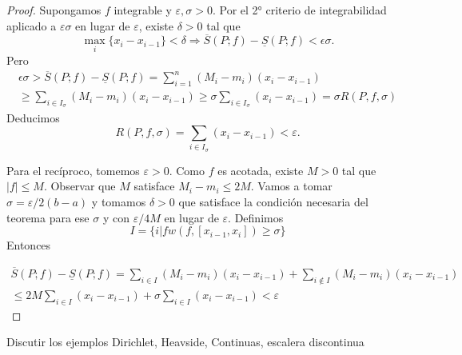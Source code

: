\begin{proof} Supongamos $f$ integrable y $\varepsilon,\sigma>0$. Por el 2° criterio de integrabilidad aplicado a $ \varepsilon\sigma$ en lugar de $\varepsilon$, existe $\delta>0$ tal que 
\[\max_i\{x_i-x_{i-1}\}<\delta\Rightarrow 
 \overline{S}(P;f)-\underline{S}(P;f)<\epsilon\sigma.
\]
Pero 
\begin{multline*}\label{eq:3crite}
\epsilon\sigma> \overline{S}(P;f)-\underline{S}(P;f)= \sum_{i=1}^n (M_i-m_i)(x_i-x_{i-1})\\
\geq \sum_{i\in I_\sigma} (M_i-m_i)(x_i-x_{i-1})\geq \sigma \sum_{i\in I_\sigma} (x_i-x_{i-1})=\sigma R(P,f,\sigma)
\end{multline*}
Deducimos
\[
 R(P,f,\sigma)=\sum_{i\in I_{\sigma}}(x_i-x_{i-1})<\varepsilon.
\]

Para el recíproco, tomemos $\varepsilon>0$. Como $f$ es acotada, existe $M>0$ tal que $|f|\leq M$.  Observar que  $M$ satisface $M_i-m_i\leq 2M$. Vamos a tomar $\sigma=\varepsilon/2(b-a)$ y tomamos $\delta>0$ que satisface la condición necesaria del teorema para ese $\sigma$ y con $\varepsilon/4M$ en lugar de $\varepsilon$. Definimos 
\[
 I=\{i \left|{f}\right. w(f,[x_{i-1},x_i])\geq \sigma\}
\]
Entonces 

\begin{multline*}\label{eq:3criteb}
 \overline{S}(P;f)-\underline{S}(P;f)= \sum_{i\in I} (M_i-m_i)(x_i-x_{i-1})+\sum_{i\notin I} (M_i-m_i)(x_i-x_{i-1})\\
 \leq 2M\sum_{i\in I}  (x_i-x_{i-1})+ \sigma \sum_{i\in I}  (x_i-x_{i-1})<\varepsilon
\end{multline*}

 
\end{proof}




\begin{ejemplo}{} Discutir los ejemplos Dirichlet, Heavside, Continuas, escalera discontinua
 
\end{ejemplo}


